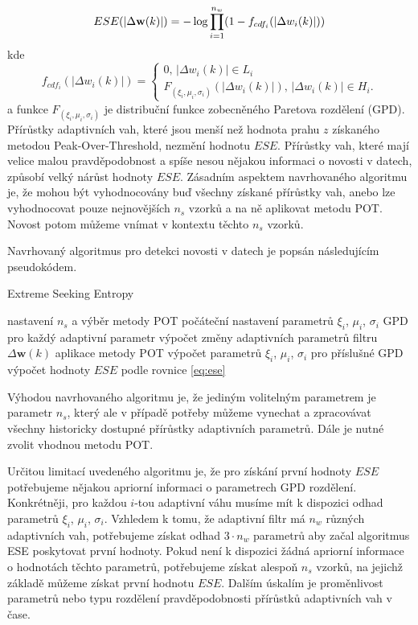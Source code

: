 \begin{equation}\label{eq:ese}
ESE(\lvert\Delta \textbf{w}(k)\rvert)=-\log \prod_{i=1}^{n_w}(1-f_{cdf_i}(\lvert\Delta w_i(k)\rvert))
\end{equation}
kde
\begin{equation}
  f_{cdf_i}(|\Delta w_i(k)|)=\begin{cases}
    0,\, |\Delta w_i(k)| \in L_i \\
    F_{(\xi_i,\mu_i,\sigma_i)}(|\Delta w_i(k)|),\, |\Delta w_i(k)| \in H_i.
  \end{cases}
\end{equation}
a funkce $F_{(\xi_i,\mu_i,\sigma_i)}$ je distribuční funkce zobecněného Paretova rozdělení (GPD). Přírůstky adaptivních vah, které jsou menší než hodnota prahu $z$ získaného metodou Peak-Over-Threshold, nezmění hodnotu $ESE$. Přírůstky vah, které mají velice malou pravděpodobnost a spíše nesou nějakou informaci o novosti v datech, způsobí velký nárůst hodnoty $ESE$. Zásadním aspektem navrhovaného algoritmu je, že mohou být vyhodnocovány buď všechny získané přírůstky vah, anebo lze vyhodnocovat pouze nejnovějších $n_s$ vzorků a na ně aplikovat metodu POT. Novost potom můžeme vnímat v kontextu těchto $n_s$ vzorků. 
\par
Navrhovaný algoritmus pro detekci novosti v datech je popsán následujícím pseudokódem.

\begin{algorithm}[H]
\caption{Extreme Seeking Entropy}
\begin{algorithmic}[1]\onehalfspacing
\STATE  nastavení $n_s$ a výběr metody POT
\STATE počáteční nastavení parametrů $\xi_i$, $\mu_i$, $\sigma_i$ GPD pro každý adaptivní parametr
\STATE výpočet změny adaptivních parametrů filtru $\Delta \textbf{w}(k)$
\STATE aplikace metody POT
\STATE výpočet parametrů $\xi_i$, $\mu_i$, $\sigma_i$ pro příslušné GPD
\ENDIF
\STATE výpočet hodnoty $ESE$ podle rovnice \ref{eq:ese}
\ENDFOR
\end{algorithmic}
\end{algorithm}

Výhodou navrhovaného algoritmu je, že jediným volitelným parametrem je parametr $n_s$, který ale v případě potřeby můžeme vynechat a zpracovávat všechny historicky dostupné přírůstky adaptivních parametrů. Dále je nutné zvolit vhodnou metodu POT.
\par
Určitou limitací uvedeného algoritmu je, že pro získání první hodnoty $ESE$ potřebujeme nějakou apriorní informaci o parametrech GPD rozdělení. Konkrétněji, pro každou $i$-tou adaptivní váhu musíme mít k dispozici odhad parametrů $\xi_i$, $\mu_i$, $\sigma_i$. Vzhledem k tomu, že adaptivní filtr má $n_w$ různých adaptivních vah, potřebujeme získat odhad $3\cdot n_w$ parametrů aby začal algoritmus ESE poskytovat první hodnoty. Pokud není k dispozici žádná apriorní informace o hodnotách těchto parametrů, potřebujeme získat alespoň $n_s$ vzorků, na jejichž základě můžeme získat první hodnotu $ESE$. Dalším úskalím je proměnlivost parametrů nebo typu rozdělení pravděpodobnosti přírůstků adaptivních vah v čase.